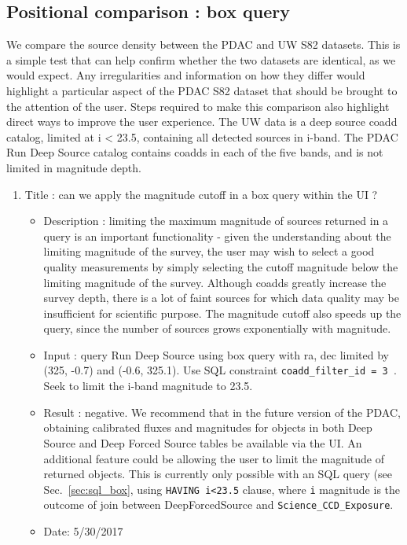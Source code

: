 \documentclass[DM,lsstdraft,toc,usenatbib]{lsstdoc}
\begin{document}
\subsection{Positional comparison : box query }

We compare the source density between the PDAC and UW S82 datasets.  This is a simple test that can help confirm whether the two datasets are identical, as we would expect. Any irregularities and information on  how they differ  would highlight a particular aspect of the PDAC S82 dataset that should be brought to the attention of the user.  Steps required to make this comparison also highlight direct ways to improve the user experience.   The UW data is a deep source coadd catalog, limited at i < 23.5, containing all detected sources in i-band.  The PDAC Run Deep Source catalog  contains coadds in each of the five bands,  and is not limited in magnitude depth. 



\begin{enumerate}
   \item Title : can we apply the magnitude cutoff in a box query within the UI ? 
    \begin{itemize}
      \item Description : limiting the maximum magnitude of sources returned in a query is an important functionality - given the understanding about the limiting magnitude of the survey, the user may wish to select a good quality measurements by simply selecting the cutoff magnitude below the limiting magnitude of the survey.  Although coadds greatly increase the survey depth,  there is a lot of faint sources for which data quality may be insufficient for scientific purpose. The magnitude cutoff also speeds up the query, since the number of sources grows exponentially with magnitude. 
      \item Input : query Run Deep Source using box query with ra, dec limited by  (325, -0.7)  and (-0.6, 325.1). Use SQL constraint \verb|coadd_filter_id = 3 |. Seek to limit the i-band magnitude to 23.5.  
      \item Result : negative.  We recommend that in the future version of the PDAC, obtaining calibrated fluxes and magnitudes for objects in  both Deep Source and Deep Forced Source tables be available via the UI.  An additional feature could be allowing the user to limit the magnitude of returned objects.  This is currently only possible with an SQL query (see Sec.~\ref{sec:sql_box}, using \verb|HAVING i<23.5| clause, where \verb|i| magnitude is the outcome of join between DeepForcedSource and \verb|Science_CCD_Exposure|. 
      \item Date: 5/30/2017
    \end{itemize}
\end{enumerate}
\end{document}

